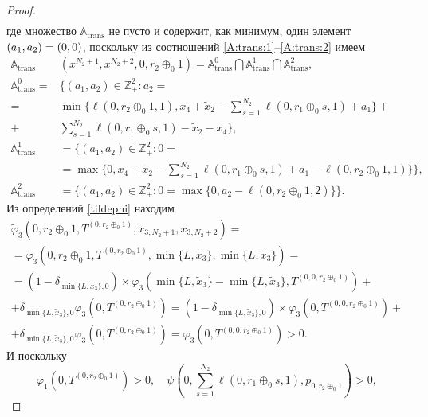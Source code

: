 \begin{proof}
\begin{multline*}
\end{multline*}
где множество ${\mathbb A}_{\mathrm{trans}}$ не пусто и содержит,  как минимум,  один элемент $(a_1,  a_2)\hm=(0, 0)$,  поскольку из соотношений \eqref{A:trans:1}--\eqref{A:trans:2} имеем
\begin{align*}
{\mathbb A}_{\mathrm{trans}}&(x^{N_2+1},  x^{N_2+2},  0,  r_2 \oplus_0 1) = {\mathbb A}_{\mathrm{trans}}^0 \bigcap {\mathbb A}_{\mathrm{trans}}^1\bigcap {\mathbb A}_{\mathrm{trans}}^2, \\
{\mathbb A}_{\mathrm{trans}}^0 =& \{(a_1,  a_2) \in \mathbb{Z}_+^2 \colon a_2 =\\
=&\min{\{\ell(0,  r_2 \oplus_0 1,  1),  x_4 + \tilde{x}_2 - \sum_{s=1}^{N_2} \ell(0, r_1 \oplus_0 s, 1) + a_1}\}   + \\
+&\sum_{s=1}^{N_2} \ell(0, r_1 \oplus_0 s, 1) -\tilde{x}_2 - x_4 \}, \\
{\mathbb A}_{\mathrm{trans}}^1 &= \{(a_1,  a_2) \in \mathbb{Z}_+^2 \colon 0 =\\
&= \max{\{0,  x_4 + \tilde{x}_2 - \sum_{s=1}^{N_2} \ell(0, r_1 \oplus_0 s, 1) + a_1-\ell(0,  r_2 \oplus_0 1,  1)\}}\}, \\
{\mathbb A}_{\mathrm{trans}}^2 &= \{(a_1,  a_2) \in \mathbb{Z}_+^2 \colon  0 = \max{\{0,  a_2-\ell(0,  r_2 \oplus_0 1,  2)\}}\}.
\end{align*}
Из определений \eqref{tildephi} находим
\begin{multline*}
\widetilde{\varphi}_3(0, r_2 \oplus_0 1,  T^{(0, r_2 \oplus_0 1)},  x_{3,  N_2+1}, x_{3,  N_2+2})= \\
=\widetilde{\varphi}_3(0, r_2 \oplus_0 1,  T^{(0, r_2 \oplus_0 1)},  \min\{L,  \tilde{x}_3\},  \min\{L,  \tilde{x}_3\})=\\
= (1-\delta_{\min\{L,  \tilde{x}_3\},  0}) \times \varphi_3(\min\{L,  \tilde{x}_3\} - \min\{L,  \tilde{x}_3\},  T^{(0,  0, r_2 \oplus_0 1)} ) +\\
+\delta_{\min\{L,  \tilde{x}_3\},  0} \varphi_3 (0,  T^{(0, r_2 \oplus_0 1)})
= (1-\delta_{\min\{L,  \tilde{x}_3\},  0}) \times \varphi_3(0,  T^{(0,  0, r_2 \oplus_0 1)} ) +\\
+\delta_{\min\{L,  \tilde{x}_3\},  0} \varphi_3 (0,  T^{(0, r_2 \oplus_0 1)}) = \varphi_3(0,  T^{(0,  0, r_2 \oplus_0 1)} ) > 0.
\end{multline*}
И поскольку 
\begin{equation*}
\varphi_1(0,  T^{(0,  r_2 \oplus_0 1)}) > 0,  \quad \psi(0,  \sum_{s=1}^{N_2} \ell(0, r_1 \oplus_0 s, 1),  p_{0,  r_2 \oplus_0 1}) > 0, 
\end{equation*}

\end{proof}
